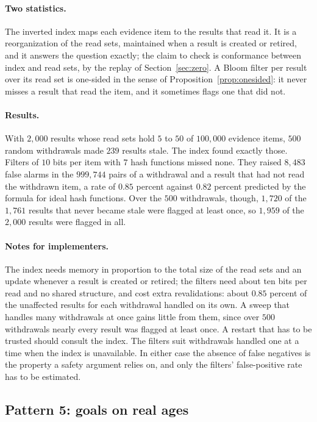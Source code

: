 \documentclass[11pt]{article}
\theoremstyle{definition}
\theoremstyle{plain}
\begin{document}
\paragraph{Two statistics.} The inverted index maps each evidence item to the results that read it.
It is a reorganization of the read sets, maintained when a result is created or retired, and it
answers the question exactly; the claim to check is conformance between index and read sets, by the
replay of Section~\ref{sec:zero}. A Bloom filter per result over its read set is one-sided in the
sense of Proposition~\ref{prop:onesided}: it never misses a result that read the item, and it
sometimes flags one that did not.

\paragraph{Results.} With $2{,}000$ results whose read sets hold $5$ to $50$ of $100{,}000$
evidence items, $500$ random withdrawals made $239$ results stale. The index found exactly those.
Filters of $10$ bits per item with $7$ hash functions missed none. They raised $8{,}483$ false
alarms in the $999{,}744$ pairs of a withdrawal and a result that had not read the withdrawn item, a
rate of $0.85$ percent against $0.82$ percent predicted by the formula for ideal hash functions.
Over the $500$ withdrawals, though, $1{,}720$ of the $1{,}761$ results that never became stale were
flagged at least once, so $1{,}959$ of the $2{,}000$ results were flagged in all.

\paragraph{Notes for implementers.} The index needs memory in proportion to the total size of the
read sets and an update whenever a result is created or retired; the filters need about ten bits per
read and no shared structure, and cost extra revalidations: about $0.85$ percent of the
unaffected results for each withdrawal handled on its own. A sweep that handles many withdrawals
at once gains little from them, since over $500$ withdrawals nearly every result was flagged at
least once. A restart that has to be trusted should consult the index. The filters suit
withdrawals handled one at a time when the index is unavailable. In either case the absence of
false negatives is the property a safety argument relies on, and only the filters' false-positive
rate has to be estimated.

\subsection{Pattern 5: goals on real ages}\label{sec:lp5}
\end{document}
